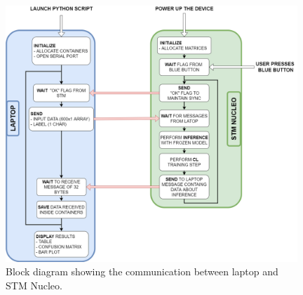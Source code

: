 \documentclass[12pt]{report}
\begin{document}
\begin{figure}[h!]
    \centering    \includegraphics[width=110mm]{Figures/Chapter4/python_nucleo.png} 
    \caption{Block diagram showing the communication between laptop and STM Nucleo.}
    \label{fig:python_stm_diagram}    
\end{figure}
\end{document}
